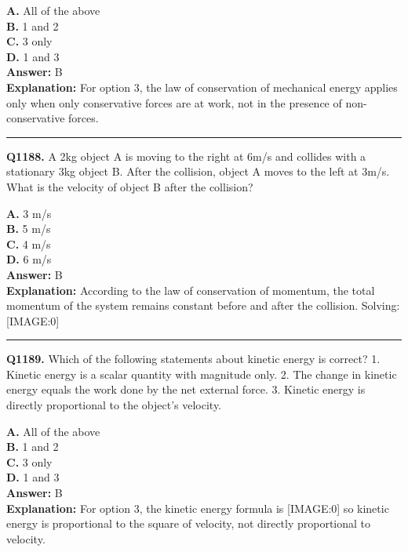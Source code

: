 \documentclass[12pt]{article}
\begin{document}
\textbf{A.} All of the above \\
\textbf{B.} 1 and 2 \\
\textbf{C.} 3 only \\
\textbf{D.} 1 and 3 \\

\textbf{Answer:} B \\
\textbf{Explanation:} For option 3, the law of conservation of mechanical energy applies only when only conservative forces are at work, not in the presence of non-conservative forces.

\hrule
\vspace{1em}


\noindent
\textbf{Q1188.} A 2kg object A is moving to the right at 6m/s and collides with a stationary 3kg object B. After the collision, object A moves to the left at 3m/s. What is the velocity of object B after the collision?



\textbf{A.} 3 m/s \\
\textbf{B.} 5 m/s \\
\textbf{C.} 4 m/s \\
\textbf{D.} 6 m/s \\

\textbf{Answer:} B \\
\textbf{Explanation:} According to the law of conservation of momentum, the total momentum of the system remains constant before and after the collision.
Solving:
[IMAGE:0]

\hrule
\vspace{1em}


\noindent
\textbf{Q1189.} Which of the following statements about kinetic energy is correct?
1.
Kinetic energy is a scalar quantity with magnitude only.
2.
The change in kinetic energy equals the work done by the net external force.
3.
Kinetic energy is directly proportional to the object's velocity.



\textbf{A.} All of the above \\
\textbf{B.} 1 and 2 \\
\textbf{C.} 3 only \\
\textbf{D.} 1 and 3 \\

\textbf{Answer:} B \\
\textbf{Explanation:} For option 3, the kinetic energy formula is
[IMAGE:0]
so kinetic energy is proportional to the square of velocity, not directly proportional to velocity.
\end{document}
